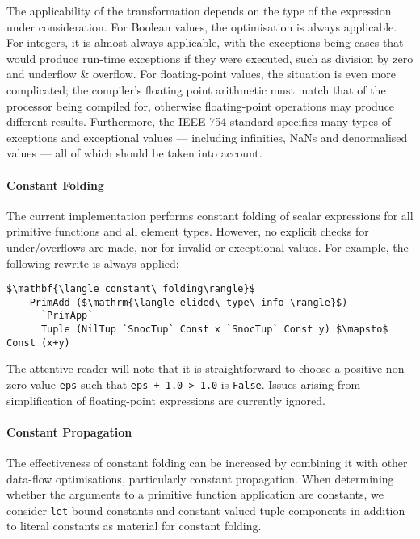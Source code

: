 The applicability of the transformation depends on the type of the expression
under consideration. For Boolean values, the optimisation is always applicable.
For integers, it is almost always applicable, with the exceptions being cases
that would produce run-time exceptions if they were executed, such as division
by zero and underflow \& overflow. For floating-point values, the situation is
even more complicated; the compiler's floating point arithmetic must match that
of the processor being compiled for, otherwise floating-point operations may
produce different results. Furthermore, the IEEE-754 standard specifies many
types of exceptions and exceptional values --- including infinities, NaNs and
denormalised values --- all of which should be taken into account.


\paragraph{Constant Folding}

The current implementation performs constant folding of scalar expressions for
all primitive functions and all element types. However, no explicit checks for
under/overflows are made, nor for invalid or exceptional values. For example,
the following rewrite is always applied:
%
%
\begin{lstlisting}[style=Haskell,numbers=none,mathescape]
$\mathbf{\langle constant\ folding\rangle}$
    PrimAdd ($\mathrm{\langle elided\ type\ info \rangle}$)
      `PrimApp`
      Tuple (NilTup `SnocTup` Const x `SnocTup` Const y) $\mapsto$ Const (x+y)
\end{lstlisting}
%
The attentive reader will note that it is straightforward to choose a positive
non-zero value \texttt{eps} such that \lstinline{eps + 1.0 > 1.0} is
\texttt{False}. Issues arising from simplification of floating-point expressions
are currently ignored.



\paragraph{Constant Propagation}

The effectiveness of constant folding can be increased by combining it with
other data-flow optimisations, particularly constant propagation. When
determining whether the arguments to a primitive function application are
constants, we consider \texttt{let}-bound constants and constant-valued tuple
components in addition to literal constants as material for constant folding.


